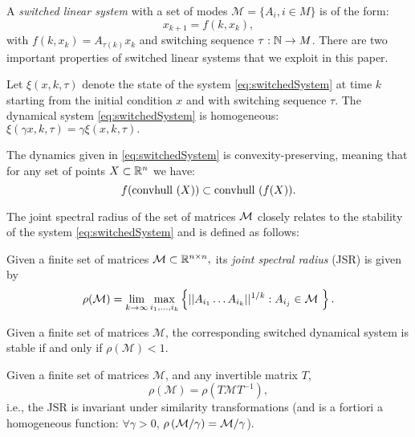 A \emph{switched linear system} with a set of modes \mbox{$\mathcal{M}= \{A_i, i \in M \}$} is of the form:
\begin{equation}\label{eq:switchedSystem}x_{k+1} = f(k,x_k),\end{equation}
with $f(k,x_k) = A_{\tau(k)}x_k$ and switching sequence \mbox{$\tau: \mathbb{N} \to M$.} There are two important properties of switched linear systems that we exploit in this paper.
\begin{property}\label{property:homogeneity}
Let $\xi(x, k, \tau)$ denote the state of the system \eqref{eq:switchedSystem} at time $k$ starting from the initial condition $x$ and with switching sequence $\tau$. The dynamical system \eqref{eq:switchedSystem} is homogeneous: $\xi(\gamma x, k, \tau)= \gamma \xi(x, k, \tau).$
\end{property}
\begin{property}\label{property:convpres}
The dynamics given in \eqref{eq:switchedSystem} is convexity-preserving, meaning that for any set of points $X \subset \mathbb{R}^n$ we have:
$$ f(\mbox{convhull }({X}))\subset \mbox{convhull }(f(X)). $$
\end{property}

The joint spectral radius of the set of matrices $\mathcal{M}$ closely relates to the stability of the system \eqref{eq:switchedSystem} and is defined as follows:
\begin{definition} Given a finite set of matrices \mbox{$\mathcal{M} \subset \mathbb{R}^{n\times n},$} its \emph{joint spectral radius} (JSR) is given by
$$\rho(\mathcal{M}) =\lim_{k\rightarrow \infty} \max_{i_1,\dots, i_k} \left\{||A_{i_1} \dots A_{i_k}||^{1/k}: A_{i_j}\in\mathcal{M}\ \right\}. $$
\end{definition}

\begin{property}
Given a finite set of matrices $\mathcal{M}$, the corresponding switched dynamical system is stable if and only if $\rho(\mathcal{M})<1$.
\end{property}

\begin{property}\label{rem:scaling}
Given a finite set of matrices $\mathcal{M}$, and any invertible matrix $T$, 
$$\rho(\mathcal{M})=\rho(T \mathcal{M} T^{-1}),$$
i.e., the JSR is invariant under similarity transformations (and is a fortiori a homogeneous function: $\forall \gamma > 0,\,$\linebreak$\rho\left(\mathcal{M}/\gamma\right)=\mathcal{M}/\gamma$).
\end{property}

